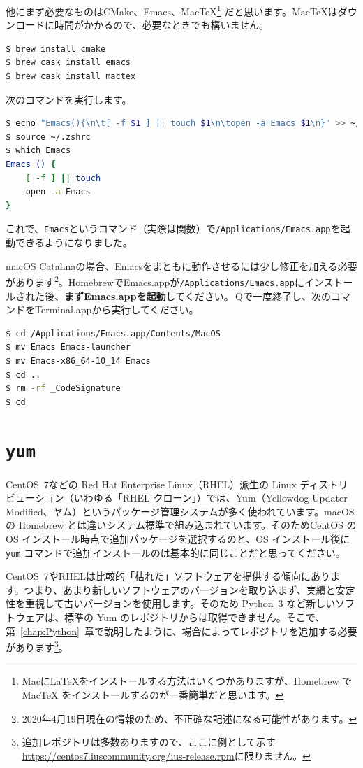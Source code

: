 他にまず必要なものはCMake、Emacs、MacTeX\footnote{Macに\LaTeX をインストールする方法はいくつかありますが、Homebrew で MacTeX をインストールするのが一番簡単だと思います。} だと思います。MacTeXはダウンロードに時間がかかるので、必要なときでも構いません。
\begin{lstlisting}[language=bash]
$ brew install cmake
$ brew cask install emacs
$ brew cask install mactex
\end{lstlisting}

次のコマンドを実行します。
\begin{lstlisting}[language=bash]
$ echo "Emacs(){\n\t[ -f $1 ] || touch $1\n\topen -a Emacs $1\n}" >> ~/.zshrc
$ source ~/.zshrc
$ which Emacs
Emacs () {
	[ -f ] || touch
	open -a Emacs
}
\end{lstlisting}
これで、\texttt{Emacs}というコマンド（実際は関数）で\texttt{/Applications/Emacs.app}を起動できるようになりました。

macOS Catalinaの場合、Emacsをまともに動作させるには少し修正を加える必要があります\footnote{2020年4月19日現在の情報のため、不正確な記述になる可能性があります。}。HomebrewでEmacs.appが\texttt{/Applications/Emacs.app}にインストールされた後、\textbf{まずEmacs.appを起動}してください。\cmdkey\,Qで一度終了し、次のコマンドをTerminal.appから実行してください。

\begin{lstlisting}[language=bash]
$ cd /Applications/Emacs.app/Contents/MacOS 
$ mv Emacs Emacs-launcher
$ mv Emacs-x86_64-10_14 Emacs
$ cd ..
$ rm -rf _CodeSignature
$ cd
\end{lstlisting}

\section{\texttt{yum}}

CentOS~7などの Red Hat Enterprise Linux（RHEL）派生の Linux ディストリビューション（いわゆる「RHEL クローン」）では、Yum（Yellowdog Updater Modified、ヤム）というパッケージ管理システムが多く使われています。macOS の Homebrew とは違いシステム標準で組み込まれています。そのためCentOS の OS インストール時点で追加パッケージを選択するのと、OS インストール後に \texttt{yum} コマンドで追加インストールのは基本的に同じことだと思ってください。

CentOS~7やRHELは比較的「枯れた」ソフトウェアを提供する傾向にあります。つまり、あまり新しいソフトウェアのバージョンを取り込まず、実績と安定性を重視して古いバージョンを使用します。そのため Python~3 など新しいソフトウェアは、標準の Yum のレポジトリからは取得できません。そこで、第~\ref{chap:Python}~章で説明したように、場合によってレポジトリを追加する必要があります\footnote{追加レポジトリは多数ありますので、ここに例として示す\url{https://centos7.iuscommunity.org/ius-release.rpm}に限りません。}。

